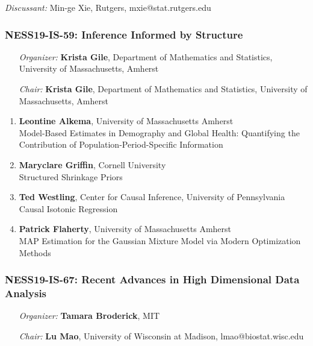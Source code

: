 \emph{Discussant:} Min-ge Xie, Rutgers, mxie@stat.rutgers.edu

\subsubsection*{NESS19-IS-59: Inference Informed by Structure}

\begin{enumerate}[align=left]
\item [\emph{Organizer:}] \textbf{Krista Gile}, Department of Mathematics and Statistics, University of Massachusetts, Amherst \\
\item [\emph{Chair:}] \textbf{Krista Gile}, Department of Mathematics and Statistics, University of Massachusetts, Amherst
\end{enumerate}

\begin{enumerate}
\item \textbf{Leontine Alkema}, University of Massachusetts Amherst \\
Model-Based Estimates in Demography and Global Health: Quantifying the Contribution of Population-Period-Specific Information
\item \textbf{Maryclare Griffin}, Cornell University \\
Structured Shrinkage Priors
\item \textbf{Ted Westling}, Center for Causal Inference, University of Pennsylvania \\
Causal Isotonic Regression
\item \textbf{Patrick Flaherty}, University of Massachusetts Amherst \\
MAP Estimation for the Gaussian Mixture Model via Modern Optimization Methods
\end{enumerate}

\subsubsection*{NESS19-IS-67: Recent Advances in High Dimensional Data Analysis}

\begin{enumerate}[align=left]
\item [\emph{Organizer:}] \textbf{Tamara Broderick}, MIT \\
\item [\emph{Chair:}] \textbf{Lu Mao},  University of Wisconsin at Madison, lmao@biostat.wisc.edu
\end{enumerate}

